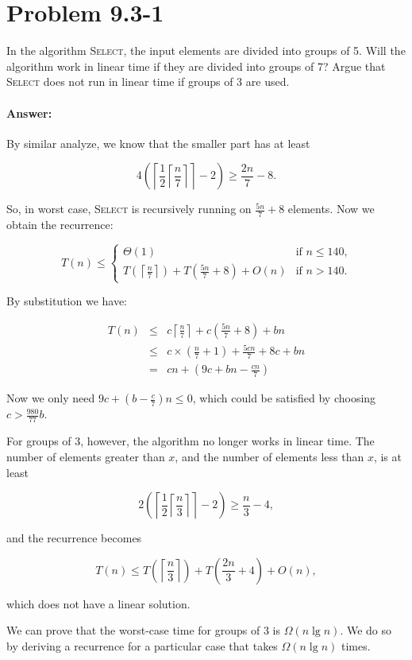 \documentclass[a4paper,10pt]{article}
\newcommand{\problem}[1]{\section*{Problem #1}}
\newcommand{\answer}{\paragraph{Answer:}}
\begin{document}
\problem{9.3-1}
In the algorithm \textsc{Select}, the input elements are divided into groups of 5.
Will the algorithm work in linear time if they are divided into groups of 7? Argue that
\textsc{Select} does not run in linear time if groups of 3 are used.
\answer

By similar analyze, we know that the smaller part has at least

$$ 4\left(\left\lceil\frac{1}{2}\left\lceil\frac{n}{7}\right\rceil\right\rceil-2\right)\geq \frac{2n}{7} - 8.$$

So, in worst case, \textsc{Select} is recursively running on $\frac{5n}{7} + 8$ elements. Now we obtain the recurrence:

\begin{equation*}
T(n) \leq \left\{
  \begin{array}{ll}
    \Theta(1)     & \text{if $n \leq 140$,}\\
    T\left(\left\lceil\frac{n}{7}\right\rceil\right) + T\left(\frac{5n}{7} + 8\right) + O(n) & \text{if $n > 140$.}
  \end{array}
\right.
\end{equation*}

By substitution we have:

\begin{eqnarray*}
T(n)  &\leq& c\left\lceil\frac{n}{7}\right\rceil + c\left(\frac{5n}{7} + 8\right) + bn\\
&\leq& c\times\left(\frac{n}{7}+1\right) + \frac{5cn}{7} + 8c + bn\\
&=&cn + \left(9 c + bn - \frac{cn}{7}\right)
\end{eqnarray*}

Now we only need $9 c + \left(b - \frac{c}{7}\right)n \leq 0$, which could be satisfied by choosing $c > \frac{980}{77}b$.

For groups of 3, however, the algorithm no longer works in linear time.
The number of elements greater than $x$, and the number of elements less than $x$, is at least

$$2\left(\left\lceil\frac{1}{2}\left\lceil\frac{n}{3}\right\rceil\right\rceil - 2\right) \geq \frac{n}{3}-4,$$

and the recurrence becomes

$$T(n)\leq T\left(\left\lceil\frac{n}{3}\right\rceil\right)+T\left(\frac{2n}{3} + 4\right) + O(n),$$

which does not have a linear solution.

We can prove that the worst-case time for groups of 3 is $\Omega(n\lg n).$
We do so by deriving a recurrence for a particular case that takes $\Omega(n\lg n)$ times.
\end{document}
